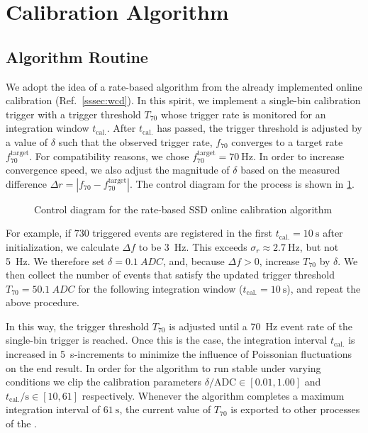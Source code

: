 \section{Calibration Algorithm}
\label{sec:ssd-online-calibration-algorithm}

\subsection{Algorithm Routine}

We adopt the idea of a rate-based algorithm from the already implemented \WCD
online calibration (Ref.~\cref{sssec:wcd}). In this spirit, we implement a 
single-bin calibration trigger with a trigger threshold $T_{70}$ whose trigger
rate is monitored for an integration window $t_\mathrm{cal.}$. After 
$t_\mathrm{cal.}$ has passed, the trigger threshold is adjusted by a value of
$\delta$ such that the observed trigger rate, $f_{70}$ converges to a target 
rate $f_{70}^\mathrm{target}$. For compatibility reasons, we chose 
$f_{70}^\mathrm{target} = \SI{70}{\hertz}$. In order to increase convergence 
speed, we also adjust the magnitude of $\delta$ based on the measured difference
$\Delta r = \left|f_{70} - f^\mathrm{target}_{70}\right|$. The control diagram
for the process is shown in \cref{fig:control-diagram}.

\begin{figure}
    \centering
    
    \caption{Control diagram for the rate-based SSD online calibration algorithm}
    \label{fig:control-diagram}
\end{figure}


For example, if $730$ triggered events are registered in the first 
$t_\mathrm{cal.} = \SI{10}{\second}$ after initialization, we calculate 
$\Delta f$ to be \SI{3}{\hertz}. This exceeds $\sigma_r\approx\SI{2.7}{\hertz}$,
but not \SI{5}{\hertz}. We therefore set $\delta=\SI{0.1}{ADC}$, and, because 
$\Delta f > 0$, increase $T_{70}$ by $\delta$. We then collect the number of 
events that satisfy the updated trigger threshold $T_{70} = \SI{50.1}{ADC}$ for
the following integration window ($t_\mathrm{cal.}=\SI{10}{\second}$), and 
repeat the above procedure.   

In this way, the trigger threshold $T_{70}$ is adjusted until a \SI{70}{\hertz} 
event rate of the single-bin trigger is reached. Once this is the case, the 
integration interval $t_\mathrm{cal.}$ is increased in 
\SI{5}{\second}-increments to minimize the influence of Poissonian fluctuations 
on the end result. In order for the algorithm to run stable under varying
conditions we clip the calibration parameters 
$\delta / \mathrm{ADC} \in [0.01, 1.00]$ and 
$t_\mathrm{cal.} / \mathrm{s} \in [10, 61]$ respectively. Whenever the algorithm
completes a maximum integration interval of $\SI{61}{\second}$, the current 
value of $T_{70}$ is exported to other processes of the \UUB.

